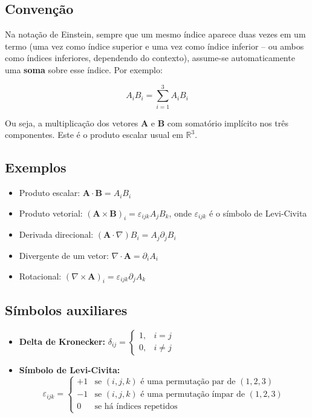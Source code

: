 \documentclass[a4paper,12pt]{article}
\begin{document}
\begin{flushleft}
\subsection*{Convenção}

Na notação de Einstein, sempre que um mesmo índice aparece duas vezes em um termo (uma vez como índice superior e uma vez como índice inferior -- ou ambos como índices inferiores, dependendo do contexto), assume-se automaticamente uma \textbf{soma} sobre esse índice. Por exemplo:

\begin{equation}
A_i B_i = \sum_{i=1}^3 A_i B_i
\end{equation}

Ou seja, a multiplicação dos vetores \( \mathbf{A} \) e \( \mathbf{B} \) com somatório implícito nos três componentes. Este é o produto escalar usual em \( \mathbb{R}^3 \).

\subsection*{Exemplos}

\begin{itemize}
    \item Produto escalar: \( \mathbf{A} \cdot \mathbf{B} = A_i B_i \)
    \item Produto vetorial: \( (\mathbf{A} \times \mathbf{B})_i = \varepsilon_{ijk} A_j B_k \), onde \( \varepsilon_{ijk} \) é o símbolo de Levi-Civita
    \item Derivada direcional: \( (\mathbf{A} \cdot \nabla) B_i = A_j \partial_j B_i \)
    \item Divergente de um vetor: \( \nabla \cdot \mathbf{A} = \partial_i A_i \)
    \item Rotacional: \( (\nabla \times \mathbf{A})_i = \varepsilon_{ijk} \partial_j A_k \)
\end{itemize}

\subsection*{Símbolos auxiliares}

\begin{itemize}
    \item \textbf{Delta de Kronecker:} \( \delta_{ij} = \begin{cases} 1, & i = j \\ 0, & i \neq j \end{cases} \)
    \item \textbf{Símbolo de Levi-Civita:} 
    \[
    \varepsilon_{ijk} = 
    \begin{cases}
        +1 & \text{se } (i,j,k) \text{ é uma permutação par de } (1,2,3) \\
        -1 & \text{se } (i,j,k) \text{ é uma permutação ímpar de } (1,2,3) \\
        0 & \text{se há índices repetidos}
    \end{cases}
    \]
\end{itemize}


\end{flushleft}
\end{document}
